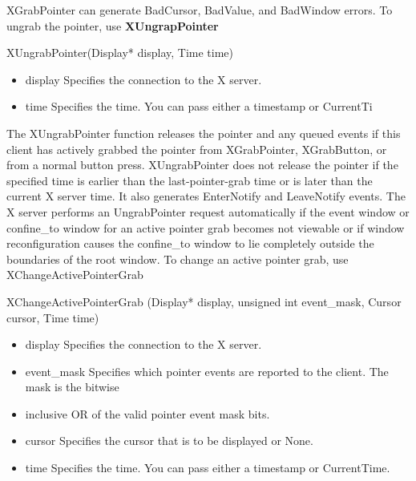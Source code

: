 \documentclass{report}
\begin{document}
\begin{itemize}
            \bigbreak \noindent 
            XGrabPointer can generate BadCursor, BadValue, and BadWindow errors.
            \bigbreak \noindent 
            To ungrab the pointer, use \textbf{XUngrapPointer}
            \bigbreak \noindent 
            \begin{cppcode}
                XUngrabPointer(Display* display, Time time)
            \end{cppcode}
            \bigbreak \noindent
            \begin{itemize}
                \item display Specifies the connection to the X server.
                \item time Specifies the time. You can pass either a timestamp or CurrentTi
            \end{itemize}
            The XUngrabPointer function releases the pointer and any queued events if this client has actively grabbed the pointer from XGrabPointer, XGrabButton, or from a normal button press. XUngrabPointer does not release the pointer if the specified time is earlier than the last-pointer-grab time or is later than the current X server time. It also generates EnterNotify and LeaveNotify events. The X server performs an UngrabPointer request automatically if the event window or confine\_to window for an active pointer grab becomes not viewable or if window reconfiguration causes the confine\_to window to lie completely outside the boundaries of the root window.
            \bigbreak \noindent 
            To change an active pointer grab, use XChangeActivePointerGrab
            \begin{cppcode}
                XChangeActivePointerGrab (Display* display, unsigned int event_mask, Cursor cursor, Time time)
            \end{cppcode}
            \bigbreak \noindent
            \begin{itemize}
                \item display Speciﬁes the connection to the X server.
                \item event\_mask Speciﬁes which pointer events are reported to the client. The mask is the bitwise
                \item inclusive OR of the valid pointer event mask bits.
                \item cursor Speciﬁes the cursor that is to be displayed or None.
                \item time Speciﬁes the time. You can pass either a timestamp or CurrentTime.

\end{itemize}
\end{itemize}
\end{document}
